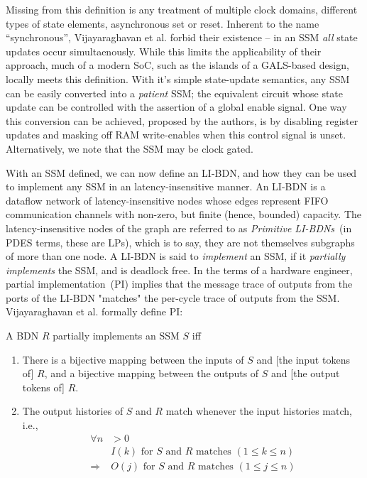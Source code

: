 Missing from this definition is any treatment of multiple clock domains, different
types of state elements, asynchronous set or reset.  Inherent to the name
``synchronous'', Vijayaraghavan et al. forbid their existence -- in an SSM
\emph{all} state updates occur simultaenously. While this limits the
applicability of their approach, much of a modern SoC, such as the islands of a
GALS-based design, locally meets this definition.  With it's simple
state-update semantics, any SSM can be easily converted into a \emph{patient}
SSM; the equivalent circuit whose state update can be controlled with the assertion of a global enable signal.
One way this conversion can be achieved, proposed by the authors, is by
disabling register updates and masking off RAM write-enables when this control
signal is unset. Alternatively, we note that the SSM may be clock gated.

With an SSM defined, we can now define an LI-BDN, and how they can be used to implement any
SSM in an latency-insensitive manner. An LI-BDN is a dataflow network of latency-insensitive nodes whose
edges represent FIFO communication channels with non-zero, but finite (hence,
bounded) capacity. The latency-insensitive nodes of the graph are
referred to as \emph{Primitive LI-BDNs}~(in PDES terms, these are LPs), which is to say, they 
are not themselves subgraphs of more than one node. A
LI-BDN is said to \emph{implement} an SSM, if it \emph{partially implements}
the SSM, and is deadlock free. In the terms of a hardware engineer, partial implementation~(PI) implies that
the message trace of outputs from the ports of the LI-BDN "matches" the
per-cycle trace of outputs from the SSM. Vijayaraghavan et al.\cite{LIBDN}
formally define PI:

\begin{widequote}
A BDN $R$ partially implements an SSM $S$ iff
\begin{enumerate}
\item There is a bijective mapping between the inputs of $S$ and
[the input tokens of] $R$, and a bijective mapping between the outputs of $S$ and
[the output tokens of] $R$.
\item The output histories of $S$ and $R$ match whenever the
input histories match, i.e.,
\begin{align*}
\forall n &> 0\\
&\text{$I(k)$ for $S$ and $R$ matches $(1 \leq k \leq n)$}\\
\Rightarrow &\text{$O(j)$ for $S$ and $R$ matches $(1 \leq j \leq n)$}
\end{align*}
\end{enumerate}
\end{widequote}

